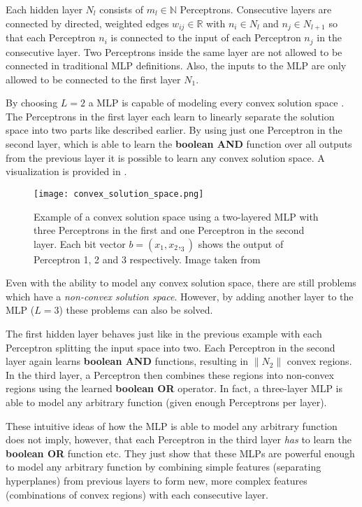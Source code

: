 Each hidden layer $N_l$ consists of $m_l \in \mathbb{N}$ Perceptrons.
Consecutive layers are connected by directed, weighted edges $w_{ij} \in \mathbb{R}$ with $n_i \in N_l$ and $n_j \in N_{l+1}$ so that each Perceptron $n_i$ is connected to the input of each Perceptron $n_j$ in the consecutive layer.
Two Perceptrons inside the same layer are not allowed to be connected in traditional MLP definitions.
Also, the inputs to the MLP are only allowed to be connected to the first layer $N_1$.

By choosing $L=2$ a MLP is capable of modeling every convex solution space \cite{rojas_neural_1996}.
The Perceptrons in the first layer each learn to linearly separate the solution space into two parts like described earlier.
By using just one Perceptron in the second layer, which is able to learn the \textbf{boolean AND} function over all outputs from the previous layer it is possible to learn any convex solution space.
A visualization is provided in .

\begin{figure}[htb!]
    \centering
    \texttt{[image: convex\_solution\_space.png]}
    \caption{Example of a convex solution space using a two-layered MLP with three Perceptrons in the first and one Perceptron in the second layer. Each bit vector $b = (x_1, x_2, _3)$ shows the output of Perceptron 1, 2 and 3 respectively. Image taken from \cite{rojas_neural_1996}}
    \label{fig:convex-solution}
\end{figure}

Even with the ability to model any convex solution space, there are still problems which have a \textit{non-convex solution space}.
However, by adding another layer to the MLP ($L=3$) these problems can also be solved.

The first hidden layer behaves just like in the previous example with each Perceptron splitting the input space into two.
Each Perceptron in the second layer again learns \textbf{boolean AND} functions, resulting in $\lVert N_2 \rVert$ convex regions.
In the third layer, a Perceptron then combines these regions into non-convex regions using the learned \textbf{boolean OR} operator.
In fact, a three-layer MLP is able to model any arbitrary function (given enough Perceptrons per layer).

These intuitive ideas of how the MLP is able to model any arbitrary function does not imply, however, that each Perceptron in the third layer \textit{has} to learn the \textbf{boolean OR} function etc.
They just show that these MLPs are powerful enough to model any arbitrary function by combining simple features (separating hyperplanes) from previous layers to form new, more complex features (combinations of convex regions) with each consecutive layer.

